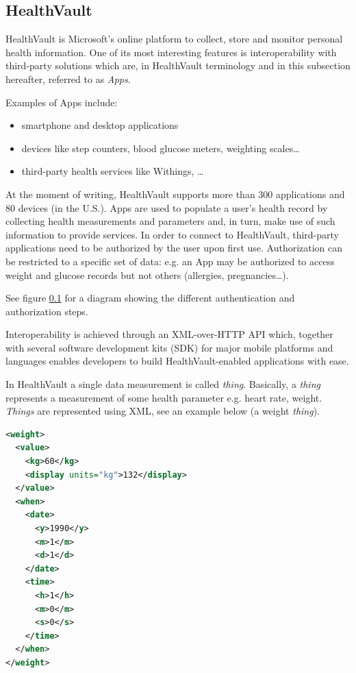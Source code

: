 \subsection{HealthVault} \nocite{HealthVault}

HealthVault is Microsoft's online platform to collect, store and monitor personal health
information. %
One of its most interesting features is interoperability with third-party solutions which are,
in HealthVault terminology and in this subsection hereafter, referred to as \textit{Apps}.

Examples of Apps include:
\begin{itemize}
\item smartphone and desktop applications
\item devices like step counters, blood glucose meters, weighting scales\ldots
\item third-party health services like Withings, \ldots
\end{itemize}

At the moment of writing, HealthVault supports more than 300 applications and 80 devices (in the U.S.).
Apps are used to populate a user's health record by collecting health measurements and parameters and,
in turn, make use of such information to provide services.
In order to connect to HealthVault, third-party applications need to be authorized by the user
upon first use. Authorization can be restricted to a specific set of data: e.g. an App may be
authorized to access weight and glucose records but not others (allergies, pregnancies\ldots).

See figure \ref{} for a diagram showing the different authentication and authorization steps.

Interoperability is achieved through an XML-over-HTTP API which, together with several
software development kits (SDK) for major mobile platforms and languages enables developers
to build HealthVault-enabled applications with ease.

In HealthVault a single data measurement is called \textit{thing}.
Basically, a \textit{thing} represents a measurement of some health parameter
e.g. heart rate, weight.
\textit{Things} are represented using XML, see an example below (a weight \textit{thing}).

\begin{lstlisting}[language=XML]
<weight>
  <value>
    <kg>60</kg>
    <display units="kg">132</display>
  </value>
  <when>
    <date>
      <y>1990</y>
      <m>1</m>
      <d>1</d>
    </date>
    <time>
      <h>1</h>
      <m>0</m>
      <s>0</s>
    </time>
  </when>
</weight>
\end{lstlisting}

